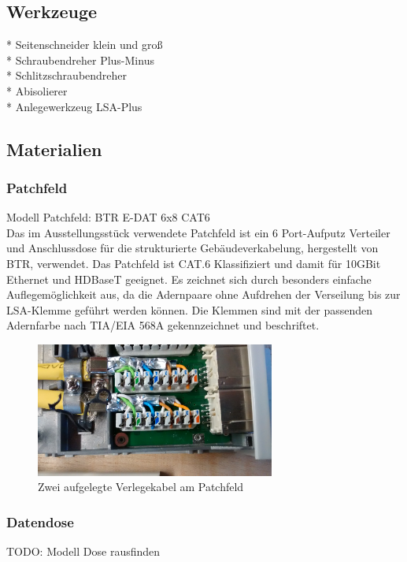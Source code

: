 \documentclass[
a4paper,     %
 headsepline, %
11pt         %
]{scrartcl}  %
\begin{document}
\subsection{Werkzeuge}
\begin{itemize}
	* Seitenschneider klein und groß \\
	* Schraubendreher Plus-Minus \\
	* Schlitzschraubendreher \\
	* Abisolierer \\
	* Anlegewerkzeug LSA-Plus \\ 
\end{itemize}

\subsection{Materialien}
\subsubsection{Patchfeld}
Modell Patchfeld: BTR E-DAT 6x8 CAT6 \\
Das im Ausstellungsstück verwendete Patchfeld ist ein 6 Port-Aufputz Verteiler und Anschlussdose für die strukturierte Gebäudeverkabelung, hergestellt von BTR, verwendet. 
Das Patchfeld ist CAT.6 Klassifiziert und damit für 10GBit Ethernet und HDBaseT geeignet. 
Es zeichnet sich durch besonders einfache Auflegemöglichkeit aus, da die Adernpaare ohne Aufdrehen der Verseilung bis zur LSA-Klemme geführt werden können.
Die Klemmen sind mit der passenden Adernfarbe nach TIA/EIA 568A gekennzeichnet und beschriftet. 

\begin{figure}[htbp] 
	\centering
	\includegraphics[width=0.7\textwidth]{patchfeld.jpg}
	\caption{Zwei aufgelegte Verlegekabel am Patchfeld}
	\label{fig:Kabel1}
\end{figure}

\subsubsection{Datendose}
TODO: Modell Dose rausfinden \\
\end{document}

